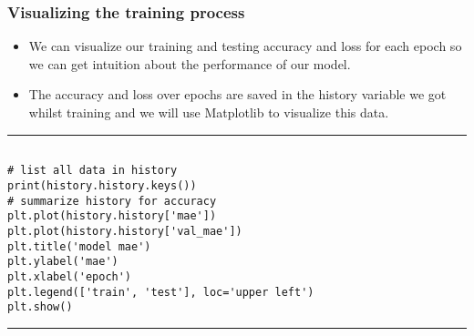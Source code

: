 \documentclass[11pt]{beamer}
\begin{document}
\begin{frame}[fragile]
\frametitle{Visualizing the training process }
\scriptsize
	\begin{itemize}
		\item We can visualize our training and testing accuracy and loss for each epoch so we can get intuition about the performance of our model. 
		\item The accuracy and loss over epochs are saved in the history variable we got whilst training and we will use Matplotlib to visualize this data.
	\end{itemize}

\rule{\textwidth}{1pt}
\begin{verbatim}

# list all data in history
print(history.history.keys())
# summarize history for accuracy
plt.plot(history.history['mae'])
plt.plot(history.history['val_mae'])
plt.title('model mae')
plt.ylabel('mae')
plt.xlabel('epoch')
plt.legend(['train', 'test'], loc='upper left')
plt.show()

\end{verbatim}
\rule{\textwidth}{1pt}
\end{frame}
\end{document}
